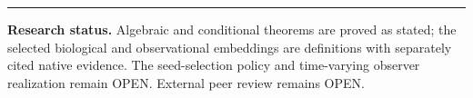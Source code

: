 \documentclass[10pt,letterpaper]{article}
\theoremstyle{definition}\newtheorem{definition}[theorem]{Definition}
\begin{document}
\vspace{4pt}\hrule\vspace{4pt}
\small\textbf{Research status.} Algebraic and conditional theorems are proved as stated; the selected biological and observational embeddings are definitions with separately cited native evidence. The seed-selection policy and time-varying observer realization remain OPEN. External peer review remains OPEN.
\end{document}
